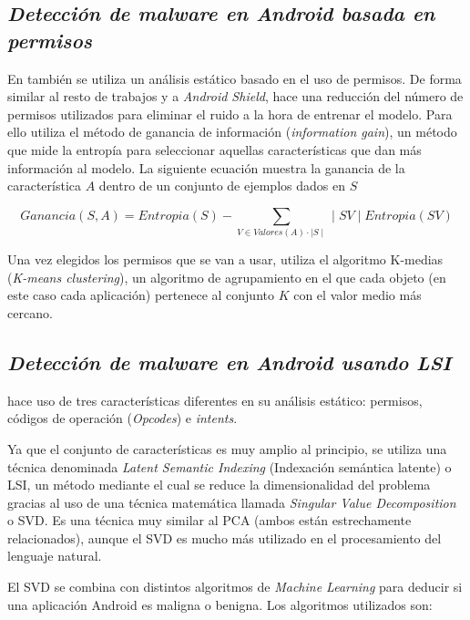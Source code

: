\subsection{\textit{Detección de malware en Android basada en permisos}}

En \hypersetup{citecolor=red}\cite{aung} también se utiliza un análisis estático basado en el uso de permisos. De forma similar al resto de trabajos y a \textit{Android Shield}, hace una reducción del número de permisos utilizados para eliminar el ruido a la hora de entrenar el modelo. Para ello utiliza el método de ganancia de información (\textit{information gain}), un método que mide la entropía para seleccionar aquellas características que dan más información al modelo. La siguiente ecuación muestra la ganancia de la característica $A$ dentro de un conjunto de ejemplos dados en $S$

\[
Ganancia(S,A) = Entropia(S)-\sum_{V\in Valores(A)\cdot \mid S\mid} \mid SV\mid Entropia(SV)
\]

Una vez elegidos los permisos que se van a usar, utiliza el algoritmo K-medias (\textit{K-means clustering}), un algoritmo de agrupamiento en el que cada objeto (en este caso cada aplicación) pertenece al conjunto $K$ con el valor medio más cercano.

\subsection{\textit{Detección de malware en Android usando LSI}}

\hypersetup{citecolor=red}\cite{kumar} hace uso de tres características diferentes en su análisis estático: permisos, códigos de operación (\textit{Opcodes}) e \textit{intents}. 

Ya que el conjunto de características es muy amplio al principio, se utiliza una técnica denominada \textit{Latent Semantic Indexing} (Indexación semántica latente) o LSI, un método mediante el cual se reduce la dimensionalidad del problema gracias al uso de una técnica matemática llamada \textit{Singular Value Decomposition} o SVD. Es una técnica muy similar al PCA (ambos están estrechamente relacionados), aunque el SVD es mucho más utilizado en el procesamiento del lenguaje natural.

El SVD se combina con distintos algoritmos de \textit{Machine Learning} para deducir si una aplicación Android es maligna o benigna. Los algoritmos utilizados son:

